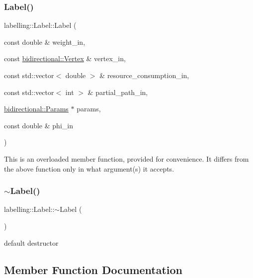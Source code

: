 \subsubsection{\texorpdfstring{Label()}{Label()}\hspace{0.1cm}{\footnotesize\ttfamily [3/3]}}
{\footnotesize\ttfamily labelling\+::\+Label\+::\+Label (\begin{DoxyParamCaption}\item[{const double \&}]{weight\+\_\+in,  }\item[{const \hyperlink{structbidirectional_1_1Vertex}{bidirectional\+::\+Vertex} \&}]{vertex\+\_\+in,  }\item[{const std\+::vector$<$ double $>$ \&}]{resource\+\_\+consumption\+\_\+in,  }\item[{const std\+::vector$<$ int $>$ \&}]{partial\+\_\+path\+\_\+in,  }\item[{\hyperlink{classbidirectional_1_1Params}{bidirectional\+::\+Params} $\ast$}]{params,  }\item[{const double \&}]{phi\+\_\+in }\end{DoxyParamCaption})}

This is an overloaded member function, provided for convenience. It differs from the above function only in what argument(s) it accepts. \mbox{\label{classlabelling_1_1Label_a72d8b0e24b8dbacc1ecb40b3c32265e2}} 
\subsubsection{\texorpdfstring{$\sim$\+Label()}{~Label()}}
{\footnotesize\ttfamily labelling\+::\+Label\+::$\sim$\+Label (\begin{DoxyParamCaption}{ }\end{DoxyParamCaption})\hspace{0.3cm}{\ttfamily [inline]}}



default destructor 



\subsection{Member Function Documentation}
\mbox{\label{classlabelling_1_1Label_ad5afbf2f5d2c6f208283021186783883}} 
